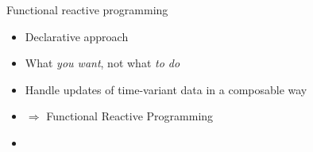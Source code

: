 \documentclass{beamer}
\begin{document}
    \begin{frame}{Functional reactive programming}
        \begin{itemize}
            \item<alert@+> Declarative approach
            \item<alert@+> What \textit{you want}, not what \textit{to do}
            \item<alert@+> Handle updates of time-variant data in a composable way
            \item<+- | alert@+> \(\Rightarrow\) Functional Reactive Programming %
            \item \inputminted{haskell}{example.hs}
        \end{itemize}
    \end{frame}
    
    
\end{document}
